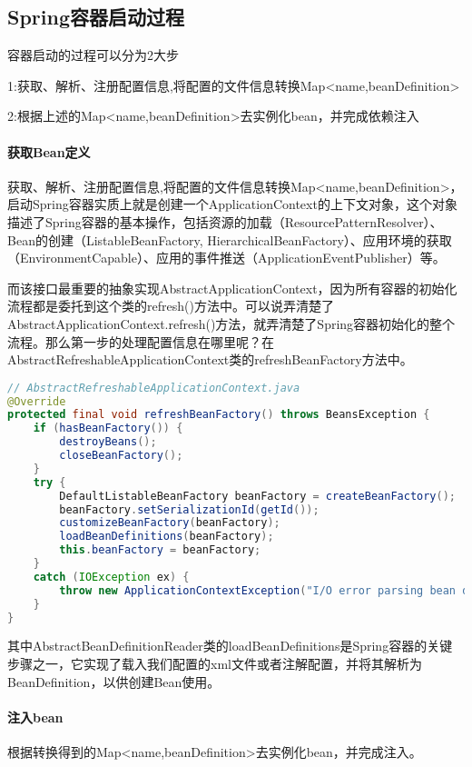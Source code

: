 \documentclass[../../../interview-questions.tex]{subfiles}
\begin{document}
\subsection{Spring容器启动过程}

容器启动的过程可以分为2大步

1:获取、解析、注册配置信息,将配置的文件信息转换Map<name,beanDefinition>

2:根据上述的Map<name,beanDefinition>去实例化bean，并完成依赖注入

\paragraph{获取Bean定义}

获取、解析、注册配置信息,将配置的文件信息转换Map<name,beanDefinition>，启动Spring容器实质上就是创建一个ApplicationContext的上下文对象，这个对象描述了Spring容器的基本操作，包括资源的加载（ResourcePatternResolver）、Bean的创建（ListableBeanFactory, HierarchicalBeanFactory）、应用环境的获取（EnvironmentCapable）、应用的事件推送（ApplicationEventPublisher）等。

而该接口最重要的抽象实现AbstractApplicationContext，因为所有容器的初始化流程都是委托到这个类的refresh()方法中。可以说弄清楚了AbstractApplicationContext.refresh()方法，就弄清楚了Spring容器初始化的整个流程。那么第一步的处理配置信息在哪里呢？在AbstractRefreshableApplicationContext类的refreshBeanFactory方法中。

\begin{lstlisting}[language=Java]
// AbstractRefreshableApplicationContext.java
@Override
protected final void refreshBeanFactory() throws BeansException {
    if (hasBeanFactory()) {
        destroyBeans();
        closeBeanFactory();
    }
    try {
        DefaultListableBeanFactory beanFactory = createBeanFactory();
        beanFactory.setSerializationId(getId());
        customizeBeanFactory(beanFactory);
        loadBeanDefinitions(beanFactory);
        this.beanFactory = beanFactory;
    }
    catch (IOException ex) {
        throw new ApplicationContextException("I/O error parsing bean definition source for " + getDisplayName(), ex);
    }
}    
\end{lstlisting}

其中AbstractBeanDefinitionReader类的loadBeanDefinitions是Spring容器的关键步骤之一，它实现了载入我们配置的xml文件或者注解配置，并将其解析为BeanDefinition，以供创建Bean使用。

\paragraph{注入bean}

根据转换得到的Map<name,beanDefinition>去实例化bean，并完成注入。
\end{document}
